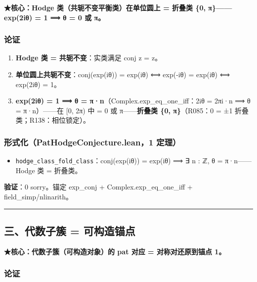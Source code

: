 \documentclass[
]{article}
\providecommand{\tightlist}{%
 \setlength{\itemsep}{0pt}\setlength{\parskip}{0pt}}
\begin{document}
\textbf{★核心：Hodge 类（共轭不变平衡类）在单位圆上 = 折叠类 \{0,
π\}------exp(2iθ) = 1 ⟹ θ = 0 或 π。}

\subsubsection{论证}\label{ux8bbaux8bc1-1}

\begin{enumerate}
\def\labelenumi{\arabic{enumi}.}
\tightlist
\item
 \textbf{Hodge 类 = 共轭不变}：实类满足 conj z = z。
\item
 \textbf{单位圆上共轭不变}：conj(exp(iθ)) = exp(iθ) ⟺ exp(-iθ) =
 exp(iθ) ⟺ exp(2iθ) = 1。
\item
 \textbf{exp(2iθ) = 1 ⟹ θ = π·n}（Complex.exp\_eq\_one\_iff：2iθ =
 2πi·n ⟹ θ = π·n）------在 {[}0, 2π) 中 = 0 或 π------\textbf{折叠类
 \{0, π\}}（R085：0 = ±1 折叠类；R138：相位锁定）。
\end{enumerate}

\subsubsection{形式化（PatHodgeConjecture.lean，1
定理）}\label{ux5f62ux5f0fux5316pathodgeconjecture.lean1-ux5b9aux7406-1}

\begin{itemize}
\tightlist
\item
 \texttt{hodge\_class\_fold\_class}：conj(exp(iθ)) = exp(iθ) ⟹ ∃ n : ℤ,
 θ = π·n------Hodge 类 = 折叠类。
\end{itemize}

\textbf{验证}：0 sorry。锚定 exp\_conj + Complex.exp\_eq\_one\_iff +
field\_simp/nlinarith。

\begin{center}\rule{0.5\linewidth}{0.5pt}\end{center}

\subsection{三、代数子簇 =
可构造锚点}\label{ux4e09ux4ee3ux6570ux5b50ux7c07-ux53efux6784ux9020ux951aux70b9}

\textbf{★核心：代数子簇（可构造对象）的 pat 对应 = 对称对还原到锚点 1。}

\subsubsection{论证}\label{ux8bbaux8bc1-2}
\end{document}
